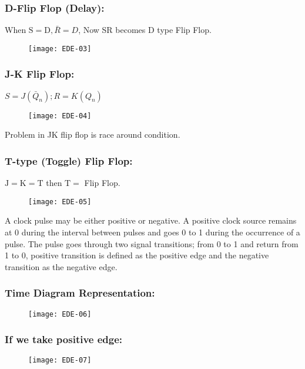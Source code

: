\subsubsection{D-Flip Flop (Delay): }
When $\mathrm{S}=\mathrm{D}, \bar{R}=D$, Now SR becomes $\mathrm{D}$ type Flip Flop.
\begin{figure}[H]
	\centering
	\texttt{[image: EDE-03]}
\end{figure}
\subsubsection{ J-K Flip Flop: }
$S=J\left(\bar{Q}_{n}\right) ; R=K\left(Q_{n}\right)$
\begin{figure}[H]
	\centering
	\texttt{[image: EDE-04]}
\end{figure}
\begin{note}
Problem in JK flip flop is race around condition.
\end{note}
\subsubsection{T-type (Toggle) Flip Flop:} $\mathrm{J}=\mathrm{K}=\mathrm{T}$ then $\mathrm{T}=$ Flip Flop.
 \begin{figure}[H]
 	\centering
 	\texttt{[image: EDE-05]}
 \end{figure}
 A clock pulse may be either positive or negative. A positive clock source remains at 0 during the interval between pulses and goes 0 to 1 during the occurrence of a pulse. The pulse goes through two signal transitions; from 0 to 1 and return from 1 to 0, positive transition is defined as the positive edge and the negative transition as the negative edge.\\
\subsubsection{Time Diagram Representation:}
 \begin{figure}[H]
 	\centering
 	\texttt{[image: EDE-06]}
 \end{figure}
\subsubsection{If we take positive edge:}
 \begin{figure}[H]
 	\centering
 	\texttt{[image: EDE-07]}
 \end{figure}
